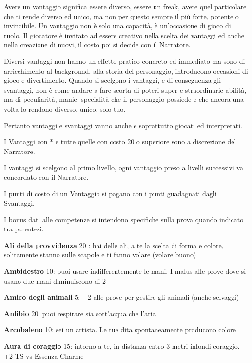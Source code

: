 \documentclass[a4paper,11pt,twoside,openany]{book}
\begin{document}
Avere un vantaggio significa essere diverso, essere un freak, avere quel particolare che ti rende diverso ed unico, ma non per questo sempre il più forte, potente o invincibile. Un vantaggio non è solo una capacità, è un'occasione di gioco di ruolo. Il giocatore è invitato ad essere creativo nella scelta dei vantaggi ed anche nella creazione di nuovi, il costo poi si decide con il Narratore.

Diversi vantaggi non hanno un effetto pratico concreto ed immediato ma sono di arricchimento al background, alla storia del personaggio, introducono occasioni di gioco e divertimento. Quando si scelgono i vantaggi, e di conseguenza gli svantaggi, non è come andare a fare scorta di poteri super e straordinarie abilità, ma di peculiarità, manie, specialità che il personaggio possiede e che ancora una volta lo rendono diverso, unico, solo tuo.

Pertanto vantaggi e svantaggi vanno anche e soprattutto giocati ed interpretati.

I Vantaggi con {*} e tutte quelle con costo 20 o superiore sono a discrezione del Narratore.

I vantaggi si scelgono al primo livello, ogni vantaggio preso a livelli successivi va concordato con il Narratore.

I punti di costo di un Vantaggio si pagano con i punti guadagnati dagli Svantaggi.

I bonus dati alle competenze si intendono specifiche sulla prova quando indicato tra parentesi.

\bigskip

\textbf{Ali della provvidenza} 20 : hai delle ali, a te la scelta di forma e colore, solitamente stanno sulle scapole e ti fanno volare (volare buono)

\textbf{Ambidestro}\label{Ambidestro} 10: puoi usare indifferentemente le mani. I malus alle prove dove si usano due mani diminuiscono di 2

\textbf{Amico degli animali} 5: +2 alle prove per gestire gli animali (anche selvaggi)

\textbf{Anfibio} 20: puoi respirare sia sott'acqua che l'aria

\textbf{Arcobaleno} 10: sei un artista. Le tue dita spontaneamente
producono colore

\textbf{Aura di coraggio} 15: intorno a te, in distanza entro 3 metri infondi coraggio. +2 TS vs Essenza Charme
\end{document}
